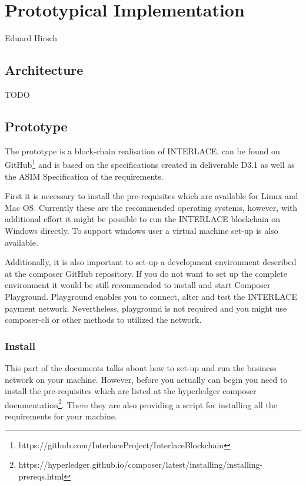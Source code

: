 \chapter{Prototypical Implementation}
\label{ch:prototype}

\vspace{-1cm}
\begin{center}
Eduard Hirsch
\end{center}

\section{Architecture}

TODO

\section{Prototype}

The prototype is a block-chain realisation of INTERLACE, can be found on GitHub\footnote{https://github.com/InterlaceProject/InterlaceBlockchain} and is based on the specifications created in deliverable D3.1 as well as the ASIM Specification of the requirements.

First it is necessary to install the pre-requisites which are available for Linux and Mac OS. Currently these are the recommended operating systems, however, with additional effort it might be possible to run the INTERLACE blockchain on Windows directly. To support windows user a virtual machine set-up is also available.

Additionally, it is also important to set-up a development environment described at the composer GitHub repository. If you do not want to set up the complete environment it would be still recommended to install and start Composer Playground. Playground enables you to connect, alter and test the INTERLACE payment network. Nevertheless, playground is not required and you might use composer-cli or other methods to utilized the network.

\subsection{Install}

This part of the documents talks about how to set-up and run the business network on your machine. However, before you actually can begin you need to install the pre-requisites which are listed at the hyperledger composer documentation\footnote{https://hyperledger.github.io/composer/latest/installing/installing-prereqs.html}. There they are also providing a script for installing all the requirements for your machine.

